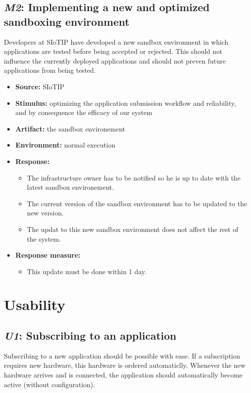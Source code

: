 \documentclass[english]{sareport}
\begin{document}
\subsection{\emph{M2}: Implementing a new and optimized sandboxing environment}
Developers at SIoTIP have developed a new sandbox environment in which applications are tested before being accepted or rejected. This should not influence the currently deployed applications and should not preven future applications from being tested.
\begin{itemize}
    \item \textbf{Source:} SIoTIP
    \item \textbf{Stimulus:} optimizing the application submission workflow and reliability, and by consequence the efficacy of our system 
    \item \textbf{Artifact:} the sandbox environement
    \item \textbf{Environment:} normal execution
    \item \textbf{Response:}
        \begin{itemize}
        	\item The infrastructure owner has to be notified so he is up to date with the latest sandbox environement.
            \item The current version of the sandbox environment has to be updated to the new version.
            \item The updat to this new sandbox environment does not affect the rest of the system.
        \end{itemize}

    \item \textbf{Response measure:}
        \begin{itemize}
            \item This update must be done within 1 day.
        \end{itemize}
\end{itemize}

\section{Usability}
\subsection{\emph{U1}: Subscribing to an application}
Subscribing to a new application should be possible with ease. If a subscription requires new hardware, this hardware is ordered automaticlly. Whenever the new hardware arrives and is connected, the application should automatically become active (without configuration).
\end{document}
